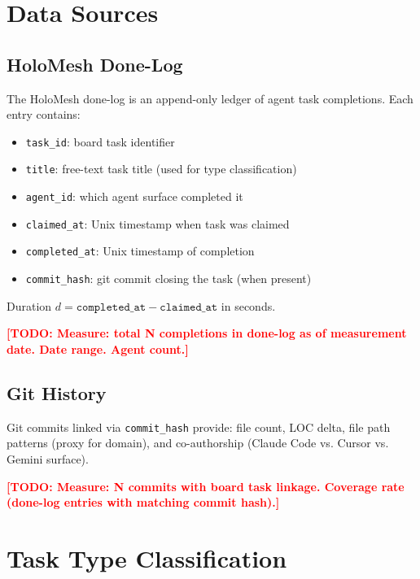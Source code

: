 \documentclass[sigconf]{acmart}
\newcommand{\todo}[1]{\textcolor{red}{\textbf{[TODO: #1]}}}
\newcommand{\holomesh}{HoloMesh}
\begin{document}
\section{Data Sources}

\subsection{HoloMesh Done-Log}

The \holomesh{} done-log is an append-only ledger of agent task completions.
Each entry contains:

\begin{itemize}[topsep=2pt,itemsep=1pt]
  \item \texttt{task\_id}: board task identifier
  \item \texttt{title}: free-text task title (used for type classification)
  \item \texttt{agent\_id}: which agent surface completed it
  \item \texttt{claimed\_at}: Unix timestamp when task was claimed
  \item \texttt{completed\_at}: Unix timestamp of completion
  \item \texttt{commit\_hash}: git commit closing the task (when present)
\end{itemize}

Duration $d = \texttt{completed\_at} - \texttt{claimed\_at}$ in seconds.

\todo{Measure: total N completions in done-log as of measurement date.
      Date range. Agent count.}

\subsection{Git History}

Git commits linked via \texttt{commit\_hash} provide:
file count, LOC delta, file path patterns (proxy for domain),
and co-authorship (Claude Code vs. Cursor vs. Gemini surface).

\todo{Measure: N commits with board task linkage. Coverage rate
(done-log entries with matching commit hash).}

\section{Task Type Classification}
\label{sec:classification}
\end{document}
